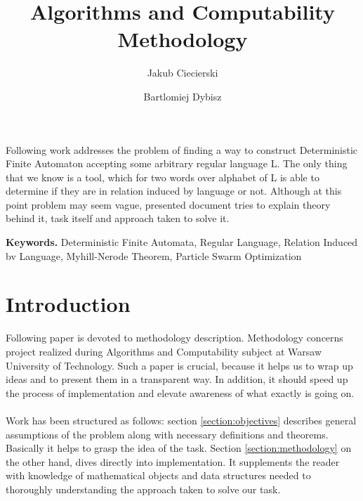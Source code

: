 \documentclass[runningheads,a4paper]{llncs}
\begin{document}
\vspace{-100pt}
\mainmatter

\title{Algorithms and Computability \\Methodology}


\author{Jakub Ciecierski \and Bartlomiej Dybisz}




\maketitle

\abstract{} Following work addresses the problem of finding a way to construct Deterministic Finite Automaton accepting some arbitrary regular language L. The only thing that we know is a tool, which for two words over alphabet of L is able to determine if they are in relation induced by language or not. Although at this point problem may seem vague, presented document tries to explain theory behind it, task itself and approach taken to solve it. 

\smallskip
\noindent \textbf{Keywords.} Deterministic Finite Automata, Regular Language, Relation Induced bv Language, Myhill-Nerode Theorem, Particle Swarm Optimization


\section{Introduction}
Following paper is devoted to methodology description. Methodology concerns project realized during Algorithms and Computability subject at Warsaw University of Technology. Such a paper is crucial, because it helps us to wrap up ideas and to present them in a transparent way. In addition, it should speed up the process of implementation and elevate awareness of what exactly is going on.
\paragraph{}
Work has been structured as follows: section \ref{section:objectives} describes general assumptions of the problem along with necessary definitions and theorems. Basically it helps to grasp the idea of the task.
Section \ref{section:methodology} on the other hand, dives directly into implementation. It supplements the reader with knowledge of mathematical objects and data structures needed to thoroughly understanding the approach taken to solve our task. 
\end{document}
